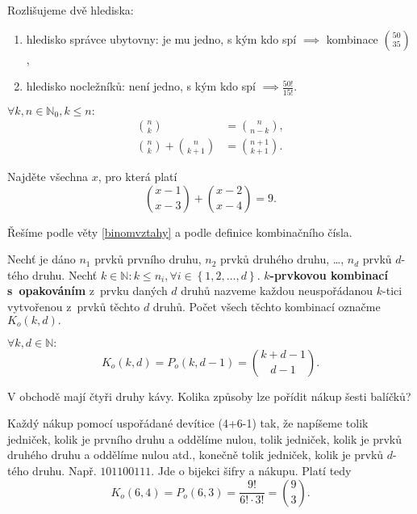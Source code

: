 \begin{reseni}
Rozlišujeme dvě hlediska:
\begin{enumerate}[1.]
\item hledisko správce ubytovny: je mu jedno, s kým kdo spí $\implies$ kombinace $\binom{50}{35}$,
\item hledisko nocležníků: není jedno, s kým kdo spí $\implies \frac{50!}{15!}$.
\end{enumerate}
\end{reseni}

\begin{veta}\label{binomvztahy}
    $\forall k,n \in \mathbb N_0, k\leq n:$
    \begin{align*}
        \binom{n}{k} &= \binom{n}{n-k}, \\
        \binom{n}{k} + \binom{n}{k+1} &= \binom{n+1}{k+1}.
    \end{align*}
\end{veta}

\begin{priklad}
Najděte všechna $x$, pro která platí
$$\binom{x-1}{x-3}+\binom{x-2}{x-4}=9.$$
\end{priklad}

\begin{reseni}
Řešíme podle věty \ref{binomvztahy} a podle definice kombinačního čísla.
\end{reseni}

\begin{definition}
    Nechť je dáno $n_1$ prvků prvního druhu, $n_2$ prvků druhého druhu, \dots,
    $n_d$ prvků $d$-tého druhu. Nechť $k\in \mathbb N: k\leq n_i, \forall i
    \in \left \{ 1,2,\dots,d \right \}$. \textbf{$k$-prvkovou kombinací s~opakováním}
    z~prvku daných $d$ druhů nazveme každou neuspořádanou $k$-tici vytvořenou z~prvků
    těchto $d$ druhů. Počet všech těchto kombinací označme $K_o(k,d).$
\end{definition}

\begin{veta}
    $\forall k,d \in \mathbb N:$
    $$K_o(k,d)=P_o(k,d-1)=\binom{k+d-1}{d-1}.$$
\end{veta}

\begin{priklad}
V obchodě mají čtyři druhy kávy. Kolika způsoby lze pořídit nákup šesti balíčků?
\end{priklad}

\begin{reseni}
Každý nákup  pomocí uspořádané devítice (4+6-1) tak, že napíšeme
tolik jedniček, kolik je prvního druhu a oddělíme nulou, tolik jedniček, kolik
je prvků druhého druhu a oddělíme nulou atd., konečně tolik jedniček,
kolik je prvků $d$-tého druhu. Např. $101100111$. Jde o bijekci šifry a nákupu.
Platí tedy
$$K_o(6,4)=P_o(6,3)=\frac{9!}{6!\cdot 3!}=\binom{9}{3}.$$
\end{reseni}

